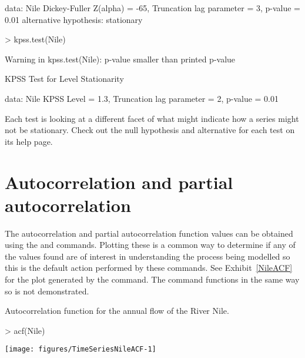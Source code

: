 \begin{Schunk}
\begin{Soutput}
data:  Nile
Dickey-Fuller Z(alpha) = -65, Truncation lag
parameter = 3, p-value = 0.01
alternative hypothesis: stationary
\end{Soutput}
\begin{Sinput}
> kpss.test(Nile) 
\end{Sinput}
\begin{Soutput}
Warning in kpss.test(Nile): p-value smaller than printed p-value
\end{Soutput}
\begin{Soutput}

	KPSS Test for Level Stationarity

data:  Nile
KPSS Level = 1.3, Truncation lag parameter = 2,
p-value = 0.01
\end{Soutput}
\end{Schunk}
Each test is looking at a different facet of what might indicate how a series might not be stationary. Check out the null hypothesis and alternative for each test on its help page. 
 
 
 
\section{Autocorrelation and partial autocorrelation} 
 
 
The autocorrelation and partial autocorrelation function values can be obtained using the  and  commands. Plotting these is a common way to determine if any of the values found are of interest in understanding the process being modelled so this is the default action performed by these commands. See Exhibit~\ref{NileACF} for the plot generated by the  command. The  command functions in the same way so is not demonstrated. 
\begin{exhibit} 
\begin{center} 
\caption{Autocorrelation function for the annual flow of the River Nile.} 
\label{NileACF} 
\begin{Schunk}
\begin{Sinput}
> acf(Nile) 
\end{Sinput}

\texttt{[image: figures/TimeSeriesNileACF-1]} \end{Schunk}
\end{center} 
\end{exhibit} 
 
